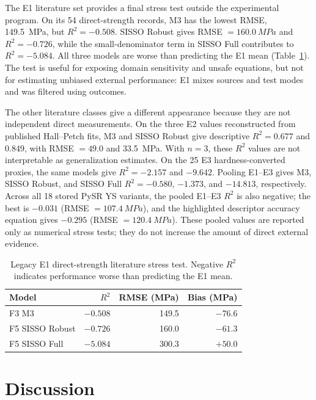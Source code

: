 \documentclass[5p,times,twocolumn]{elsarticle}
\begin{document}
The E1 literature set provides a final stress test outside the experimental program. On its 54 direct-strength records, M3 has the lowest RMSE, \SI{149.5}{MPa}, but $R^2=-0.508$. SISSO Robust gives RMSE $=\SI{160.0}{MPa}$ and $R^2=-0.726$, while the small-denominator term in SISSO Full contributes to $R^2=-5.084$. All three models are worse than predicting the E1 mean (Table~\ref{tab:external}). The test is useful for exposing domain sensitivity and unsafe equations, but not for estimating unbiased external performance: E1 mixes sources and test modes and was filtered using outcomes.

The other literature classes give a different appearance because they are not independent direct measurements. On the three E2 values reconstructed from published Hall--Petch fits, M3 and SISSO Robust give descriptive $R^2=0.677$ and 0.849, with RMSE $=49.0$ and \SI{33.5}{MPa}. With $n=3$, these $R^2$ values are not interpretable as generalization estimates. On the 25 E3 hardness-converted proxies, the same models give $R^2=-2.157$ and $-9.642$. Pooling E1--E3 gives M3, SISSO Robust, and SISSO Full $R^2=-0.580$, $-1.373$, and $-14.813$, respectively. Across all 18 stored PySR YS variants, the pooled E1--E3 $R^2$ is also negative; the best is $-0.031$ (RMSE $=\SI{107.4}{MPa}$), and the highlighted descriptor accuracy equation gives $-0.295$ (RMSE $=\SI{120.4}{MPa}$). These pooled values are reported only as numerical stress tests; they do not increase the amount of direct external evidence.

\begin{table}[t]
\centering
\caption{Legacy E1 direct-strength literature stress test. Negative $R^2$ indicates performance worse than predicting the E1 mean.}
\label{tab:external}
\small
\begin{tabular}{lrrr}
\toprule
Model & $R^2$ & RMSE (MPa) & Bias (MPa) \\
\midrule
F3 M3 & $-0.508$ & 149.5 & $-76.6$ \\
F5 SISSO Robust & $-0.726$ & 160.0 & $-61.3$ \\
F5 SISSO Full & $-5.084$ & 300.3 & $+50.0$ \\
\bottomrule
\end{tabular}
\end{table}

\section{Discussion}
\label{sec:discussion}
\end{document}
